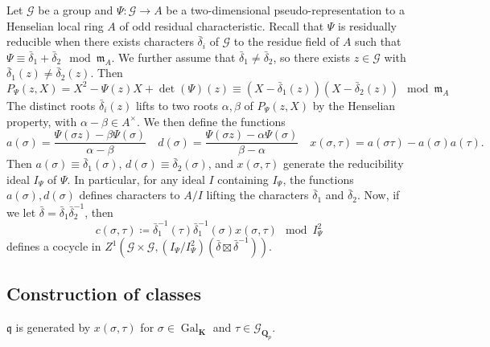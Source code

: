 \documentclass[leqno]{amsart}
\newcommand{\Gp}{\mathcal{G}_{\Qp}} %
\DeclareMathOperator{\Gal}{Gal}
\newcommand{\Qp}{\mathbf{Q}_p}
\newcommand{\K}{{\mathbf{K}}} %
\newcommand{\fm}{\mathfrak{m}}
\newcommand{\fq}{\mathfrak{q}}
\theoremstyle{definition}
\theoremstyle{remark}
\begin{document}
Let $\mathcal{G}$ be a group and 
$\Psi\colon \mathcal{G}\to A$
be a two-dimensional pseudo-representation
to a Henselian local ring $A$
of odd residual characteristic.
Recall that 
$\Psi$ is residually reducible
when there exists characters
$ \bar{\delta}_i$ of $\mathcal{G}$
to the residue field of  $A$
such that  
$\Psi\equiv \bar{\delta}_1+\bar{\delta}_2\mod \fm_A$.
We further assume that $\bar{\delta}_1\neq \bar{\delta}_2$,
so there exists $z\in \mathcal{G}$
with  $\bar{\delta}_1(z)\neq \bar{\delta}_2(z)$.
Then
\begin{equation}
    P_\Psi(z,X)=
    X^2-\Psi(z)X+\det(\Psi)(z) \equiv 
    (X-\bar{\delta}_1(z))(X-\bar{\delta}_2(z))
    \mod \fm_A
\end{equation}
The distinct roots $\bar{\delta}_i(z)$
lifts to two roots $\alpha,\beta$ of  $P_\Psi(z,X)$
by the Henselian property,
with $\alpha-\beta\in A^\times$.
We then define the functions
\begin{equation}
   a(\sigma)=
   \frac{\Psi(\sigma z)-\beta\Psi(\sigma)}{\alpha-\beta}\quad
   d(\sigma)=
   \frac{\Psi(\sigma z)-\alpha\Psi(\sigma)}{\beta-\alpha}\quad
   x(\sigma,\tau)=a(\sigma\tau)-a(\sigma)a(\tau).
\end{equation}
Then 
$a(\sigma)\equiv \bar{\delta}_1(\sigma)$,
$d(\sigma)\equiv \bar{\delta}_2(\sigma)$,
and $x(\sigma,\tau)$
generate the reducibility ideal
$I_\Psi$ of  $\Psi$.
In particular,
for any ideal $I$ containing $I_\Psi$,
the functions $a(\sigma),d(\sigma)$
defines characters to  $A/I$
lifting the characters
$\bar{\delta}_1$ and $\bar{\delta}_2$.
Now, if we let
$\bar{\delta}=\bar{\delta}_1\bar{\delta}_2^{-1}$, then
\begin{equation*}
    c(\sigma,\tau)\coloneqq \bar{\delta}_1^{-1}(\tau)
    \bar{\delta}_1^{-1}(\sigma)x(\sigma, \tau)\mod I_\Psi^2
\end{equation*}
defines a cocycle in 
$Z^1(\mathcal{G}\times \mathcal{G}, 
(I_\Psi/I_\Psi^2)(\bar{\delta}\boxtimes \bar{\delta}^{-1}))$.


\subsection{Construction of classes}

$\fq$
is generated by  $x(\sigma,\tau)$
for  $\sigma\in \Gal_\K$
and  $\tau\in \Gp$.
\end{document}
